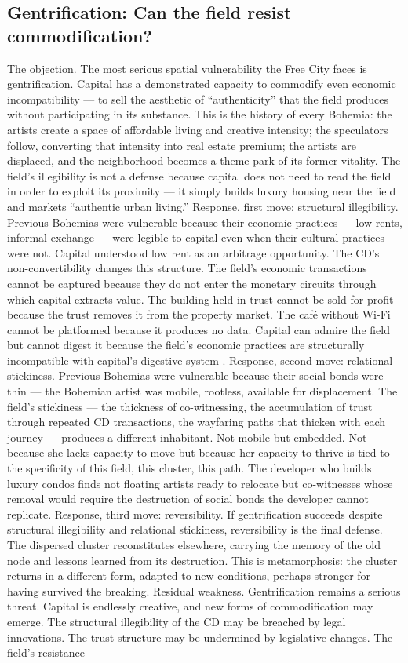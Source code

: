 \subsection{Gentrification: Can the field resist commodification?}

The objection. The most serious spatial vulnerability the Free City faces is gentrification. Capital has a demonstrated capacity to commodify even economic incompatibility — to sell the aesthetic of “authenticity” that the field produces without participating in its substance. This is the history of every Bohemia: the artists create a space of affordable living and creative intensity; the speculators follow, converting that intensity into real estate premium; the artists are displaced, and the neighborhood becomes a theme park of its former vitality. The field’s illegibility is not a defense because capital does not need to read the field in order to exploit its proximity — it simply builds luxury housing near the field and markets “authentic urban living.” Response, first move: structural illegibility. Previous Bohemias were vulnerable because their economic practices — low rents, informal exchange — were legible to capital even when their cultural practices were not. Capital understood low rent as an arbitrage opportunity. The CD’s non-convertibility changes this structure. The field’s economic transactions cannot be captured because they do not enter the monetary circuits through which capital extracts value. The building held in trust cannot be sold for profit because the trust removes it from the property market. The café without Wi-Fi cannot be platformed because it produces no data. Capital can admire the field but cannot digest it because the field’s economic practices are structurally incompatible with capital’s digestive system \cite{madden_marcuse_2016}. Response, second move: relational stickiness. Previous Bohemias were vulnerable because their social bonds were thin — the Bohemian artist was mobile, rootless, available for displacement. The field’s stickiness — the thickness of co-witnessing, the accumulation of trust through repeated CD transactions, the wayfaring paths that thicken with each journey — produces a different inhabitant. Not mobile but embedded. Not because she lacks capacity to move but because her capacity to thrive is tied to the specificity of this field, this cluster, this path. The developer who builds luxury condos finds not floating artists ready to relocate but co-witnesses whose removal would require the destruction of social bonds the developer cannot replicate. Response, third move: reversibility. If gentrification succeeds despite structural illegibility and relational stickiness, reversibility is the final defense. The dispersed cluster reconstitutes elsewhere, carrying the memory of the old node and lessons learned from its destruction. This is metamorphosis: the cluster returns in a different form, adapted to new conditions, perhaps stronger for having survived the breaking. Residual weakness. Gentrification remains a serious threat. Capital is endlessly creative, and new forms of commodification may emerge. The structural illegibility of the CD may be breached by legal innovations. The trust structure may be undermined by legislative changes. The field’s resistance 